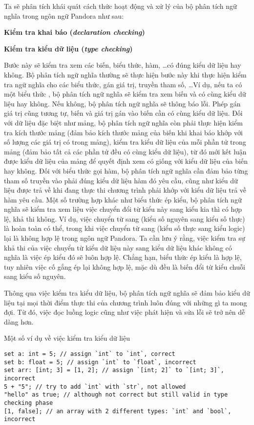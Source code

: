     Ta sẽ phân tích khái quát cách thức hoạt động và xử lý của bộ phân tích ngữ nghĩa trong ngôn ngữ Pandora như sau:

\noindent \textbf{Kiểm tra khai báo (\textit{declaration checking})}

\noindent \textbf{Kiểm tra kiểu dữ liệu (\textit{type checking})}

    Bước này sẽ kiểm tra xem các biến, biểu thức, hàm, \dots có đúng kiểu dữ liệu hay không. Bộ phân tích ngữ nghĩa thường sẽ thực hiện bước này khi thực hiện kiểm tra ngữ nghĩa cho các biểu thức, gán giá trị, truyền tham số, \dots Ví dụ, nếu ta có một biểu thức , bộ phân tích ngữ nghĩa sẽ kiểm tra xem biến  và  có cùng kiểu dữ liệu hay không. Nếu không, bộ phân tích ngữ nghĩa sẽ thông báo lỗi. Phép gán giá trị cũng tương tự, biến và giá trị gán vào biến cần có cùng kiểu dữ liệu. Đối với dữ liệu đặc biệt như mảng, bộ phân tích ngữ nghĩa còn phải thực hiện kiểm tra kích thước mảng (đảm bảo kích thước mảng của biến khi khai báo khớp với số lượng các giá trị có trong mảng), kiểm tra kiểu dữ liệu của mỗi phần tử trong mảng (đảm bảo tất cả các phần tử đều có cùng kiểu dữ liệu), từ đó mới kết luận được kiểu dữ liệu của mảng để quyết định xem có giống với kiểu dữ liệu của biến hay không. Đối với biểu thức gọi hàm, bộ phân tích ngữ nghĩa cần đảm bảo từng tham số truyền vào phải đúng kiểu dữ liệu hàm đó yêu cầu, cũng như kiểu dữ liệu được trả về khi đang thực thi chương trình phải khớp với kiểu dữ liệu trả về hàm yêu cầu. Một số trường hợp khác như biểu thức ép kiểu, bộ phân tích ngữ nghĩa sẽ kiểm tra xem liệu việc chuyển đổi từ kiểu này sang kiểu kia thì có hợp lệ, khả thi không. Ví dụ, việc chuyển từ  sang  (kiểu số nguyên sang kiểu số thực) là hoàn toàn có thể, trong khi việc chuyển từ  sang  (kiểu số thực sang kiểu logic) lại là không hợp lệ trong ngôn ngữ Pandora. Ta cần lưu ý rằng, việc kiểm tra sự khả thi của việc chuyển từ kiểu dữ liệu này sang kiểu dữ liệu khác không có nghĩa là việc ép kiểu đó sẽ luôn hợp lệ. Chẳng hạn, biểu thức ép kiểu  là hợp lệ, tuy nhiên việc cố gắng ép  lại không hợp lệ, mặc dù đều là biến đổi từ kiểu chuỗi sang kiểu số nguyên. 

    Thông qua việc kiểm tra kiểu dữ liệu, bộ phân tích ngữ nghĩa sẽ đảm bảo kiểu dữ liệu tại mọi thời điểm thực thi của chương trình luôn đúng với những gì ta mong đợi. Từ đó, việc đọc luồng logic cũng như việc phát hiện và sửa lỗi sẽ trở nên dễ dàng hơn.

\noindent Một số ví dụ về việc kiểm tra kiểu dữ liệu
\begin{lstlisting}[]
set a: int = 5; // assign `int` to `int`, correct
set b: float = 5; // assign `int` to `float`, incorrect
set arr: [int; 3] = [1, 2]; // assign `[int; 2]` to `[int; 3]`, incorrect
5 + "5"; // try to add `int` with `str`, not allowed
"hello" as true; // although not correct but still valid in type checking phase
[1, false]; // an array with 2 different types: `int` and `bool`, incorrect
\end{lstlisting}

